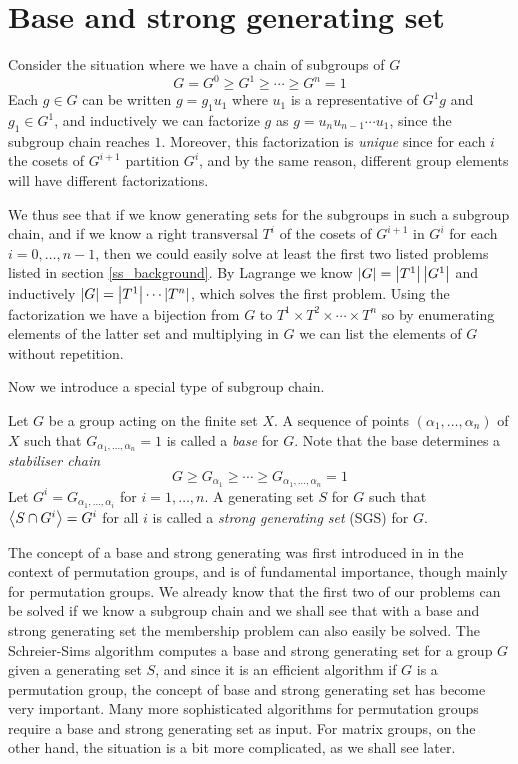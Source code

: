 \section{Base and strong generating set} \label{section:bsgs}
Consider the situation where we have a chain of subgroups of $G$
\begin{equation}
G = G^0 \geq G^1 \geq \dotsb \geq G^n = 1
\end{equation}
Each $g \in G$ can be written $g = g_1 u_1$ where $u_1$ is a
representative of $G^1 g$ and $g_1 \in G^1$, and inductively we can
factorize $g$ as $g = u_n u_{n - 1} \dotsm u_1$, since the subgroup chain
reaches $1$. Moreover, this factorization is \emph{unique} since for each $i$ the cosets of $G^{i + 1}$ partition $G^i$, and by the same reason, different group elements will have different factorizations.

We thus see that if we know generating sets for the subgroups in such
a subgroup chain, and if we know a right transversal $T^i$ of the cosets of
$G^{i + 1}$ in $G^i$ for each $i = 0, \dotsc, n - 1$, then we could easily
solve at least the first two listed problems listed in section
\ref{ss_background}. By Lagrange we know $\left\lvert G \right\rvert = \left\lvert T^1 \right\rvert
\left\lvert G^1 \right\rvert$ and inductively $\left\lvert G \right\rvert = \left\lvert T^1 \right\rvert \dotsm \left\lvert T^n \right\rvert$,
which solves the first problem. Using the factorization we have a
bijection from $G$ to $T^1 \times T^2 \times \dotsb \times T^n$ so by
enumerating elements of the latter set and multiplying in $G$ we can list the elements of $G$ without repetition.

Now we introduce a special type of subgroup chain.
\begin{deff}
  Let $G$ be a group acting on the finite set $X$. A sequence of points
  $(\alpha_1, \dotsc, \alpha_n)$ of $X$ such that
  $G_{\alpha_1, \dotsc, \alpha_n} = 1$ is called a \emph{base} for
  $G$. Note that the base determines a \emph{stabiliser chain}
\begin{equation}
G \geq G_{\alpha_1} \geq \dotsb \geq G_{\alpha_1, \dotsc, \alpha_n} = 1
\end{equation}
Let $G^i = G_{\alpha_1, \dotsc, \alpha_i}$ for $i = 1, \dotsc, n$. A generating set $S$ for $G$ such that $\left\langle S \cap G^i \right\rangle = G^i$ for all $i$ is called a \emph{strong generating set} (SGS) for $G$.
\end{deff}

The concept of a base and strong generating was first introduced in
\cite{sims70} in the context of permutation groups, and is of
fundamental importance, though mainly for permutation groups. We
already know that the first two of our problems can be solved if we
know a subgroup chain and we shall see that with a base and strong
generating set the membership problem can also easily be solved. The
Schreier-Sims algorithm computes a base and strong generating set for
a group $G$ given a generating set $S$, and since it is an efficient
algorithm if $G$ is a permutation group, the concept of base and
strong generating set has become very important. Many more
sophisticated algorithms for permutation groups require a base and
strong generating set as input. For matrix groups, on the other hand,
the situation is a bit more complicated, as we shall see later.

